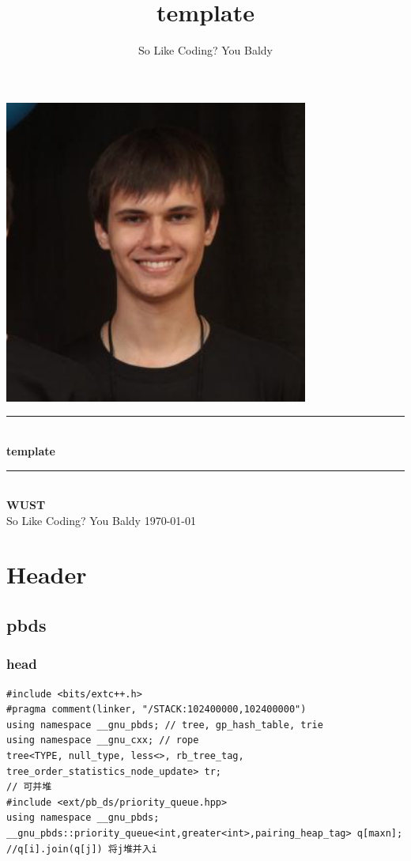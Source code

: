 \documentclass[twoside]{article}
\title{template}
\author{So Like Coding? You Baldy}
\newcommand{\HRule}{\rule{\linewidth}{0.5mm}}
\begin{document}
\small
\begin{titlepage}
\begin{center}
\vspace*{0.5cm}\includegraphics[width=0.75\textwidth]{logo.jpg} \\ [2cm]
\HRule \\ [1cm]
\textbf{\Huge{template}} \\ [0.5cm]
\HRule \\ [4cm]
\textbf{\Huge{WUST}} \\ [1cm]
\LARGE{So Like Coding? You Baldy}
\vfill
\Large{\today}
\end{center}
\clearpage
\end{titlepage}
\tableofcontents\clearpage
\pagestyle{fancy}
\lfoot{}
\cfoot{\thepage}\rfoot{}
\setcounter{section}{-1}
\setcounter{page}{1}
\clearpage\section{Header}
\subsection{pbds}
\subsubsection{head}
\begin{lstlisting}
#include <bits/extc++.h>
#pragma comment(linker, "/STACK:102400000,102400000")
using namespace __gnu_pbds; // tree, gp_hash_table, trie
using namespace __gnu_cxx; // rope
tree<TYPE, null_type, less<>, rb_tree_tag, tree_order_statistics_node_update> tr;
// 可并堆
#include <ext/pb_ds/priority_queue.hpp>
using namespace __gnu_pbds;
__gnu_pbds::priority_queue<int,greater<int>,pairing_heap_tag> q[maxn];
//q[i].join(q[j]) 将j堆并入i
 \end{lstlisting}
\end{document}
